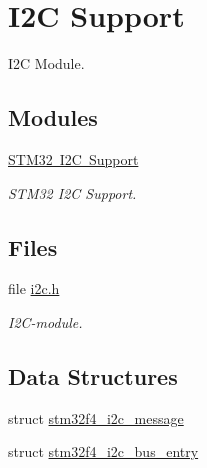 \hypertarget{group__stm32f4__i2c}{}\section{I2C Support}
\label{group__stm32f4__i2c}


I2C Module.  


\subsection*{Modules}
\begin{DoxyCompactItemize}
\item 
\mbox{\hyperlink{group__stm32__i2c}{S\+T\+M32 I2\+C Support}}
\begin{DoxyCompactList}\small\item\em S\+T\+M32 I2C Support. \end{DoxyCompactList}\end{DoxyCompactItemize}
\subsection*{Files}
\begin{DoxyCompactItemize}
\item 
file \mbox{\hyperlink{bsps_2arm_2stm32f4_2include_2bsp_2i2c_8h}{i2c.\+h}}
\begin{DoxyCompactList}\small\item\em I2\+C-\/module. \end{DoxyCompactList}\end{DoxyCompactItemize}
\subsection*{Data Structures}
\begin{DoxyCompactItemize}
\item 
struct \mbox{\hyperlink{structstm32f4__i2c__message}{stm32f4\+\_\+i2c\+\_\+message}}
\item 
struct \mbox{\hyperlink{structstm32f4__i2c__bus__entry}{stm32f4\+\_\+i2c\+\_\+bus\+\_\+entry}}
\end{DoxyCompactItemize}

